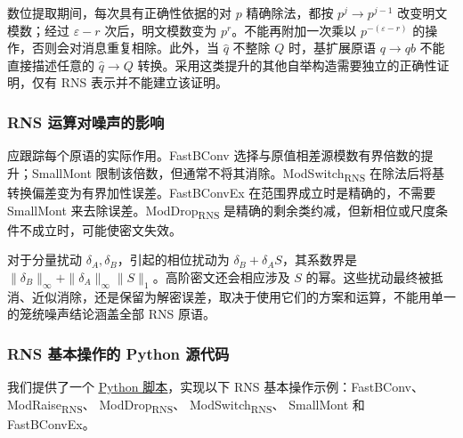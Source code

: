 数位提取期间，每次具有正确性依据的对 $p$ 精确除法，都按 $p^j\rightarrow p^{j-1}$ 改变明文模数；经过 $\varepsilon-r$ 次后，明文模数变为 $p^r$。不能再附加一次乘以 $p^{-(\varepsilon-r)}$ 的操作，否则会对消息重复相除。此外，当 $\hat q$ 不整除 $Q$ 时，基扩展原语 $q\rightarrow qb$ 不能直接描述任意的 $\hat q\rightarrow Q$ 转换。采用这类提升的其他自举构造需要独立的正确性证明，仅有 RNS 表示并不能建立该证明。


\subsubsection{RNS 运算对噪声的影响}
\label{subsubsec:rns-noise}

应跟踪每个原语的实际作用。\textsf{FastBConv} 选择与原值相差源模数有界倍数的提升；\textsf{SmallMont} 限制该倍数，但通常不将其消除。\textsf{ModSwitch\textsubscript{RNS}} 在除法后将基转换偏差变为有界加性误差。\textsf{FastBConvEx} 在范围界成立时是精确的，不需要 \textsf{SmallMont} 来去除误差。\textsf{ModDrop\textsubscript{RNS}} 是精确的剩余类约减，但新相位或尺度条件不成立时，可能使密文失效。

对于分量扰动 $\delta_A,\delta_B$，引起的相位扰动为 $\delta_B+\delta_AS$，其系数界是 $\|\delta_B\|_\infty+\|\delta_A\|_\infty\|S\|_1$。高阶密文还会相应涉及 $S$ 的幂。这些扰动最终被抵消、近似消除，还是保留为解密误差，取决于使用它们的方案和运算，不能用单一的笼统噪声结论涵盖全部 RNS 原语。

\subsubsection{RNS 基本操作的 Python 源代码}
\label{subsubsec:rns-source-code}

我们提供了一个 \href{https://github.com/wang2000star/fhe-textbook-cn/blob/chinese-edition/source%20code/rns.py}{\underline{Python 脚本}}，实现以下 RNS 基本操作示例：\textsf{FastBConv}、
\textsf{ModRaise\textsubscript{RNS}}、
\textsf{ModDrop\textsubscript{RNS}}、
\textsf{ModSwitch\textsubscript{RNS}}、
\textsf{SmallMont} 和
\textsf{FastBConvEx}。





